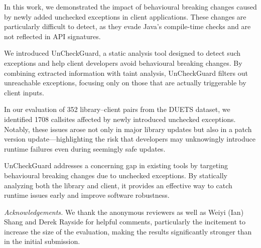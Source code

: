 In this work, we demonstrated the impact of behavioural breaking changes caused by newly added unchecked exceptions in client applications. These changes are particularly difficult to detect, as they evade Java's compile-time checks and are not reflected in API signatures.

We introduced UnCheckGuard, a static analysis tool designed to detect such exceptions and help client developers avoid behavioural breaking changes. By combining extracted information with taint analysis, UnCheckGuard filters out unreachable exceptions, focusing only on those that are actually triggerable by client inputs.

In our evaluation of 352 library–client pairs from the DUETS dataset, we identified 1708 callsites affected by newly introduced unchecked exceptions. Notably, these issues arose not only in major library updates but also in a patch version update—highlighting the risk that developers may unknowingly introduce runtime failures even during seemingly safe updates.

UnCheckGuard addresses a concerning gap in existing tools by targeting behavioural breaking changes due to unchecked exceptions. By statically analyzing both the library and client, it provides an effective way to catch runtime issues early and improve software robustness.

\vspace*{1em} \noindent
\textit{Acknowledgements.} We thank the anonymous reviewers as well as Weiyi (Ian) Shang and Derek Rayside for helpful comments, particularly the incitement to increase the size of the evaluation, making the results significantly stronger than in the initial submission.
